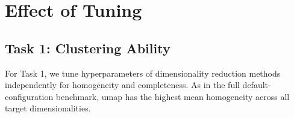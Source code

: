 


\FloatBarrier
\section{Effect of Tuning}
\label{app:ch05:tuned-results}

\FloatBarrier
\subsection{Task 1: Clustering Ability}



\FloatBarrier
For Task 1, we tune hyperparameters of dimensionality reduction methods independently for homogeneity and completeness. As in the full default-configuration benchmark, \gls{umap} has the highest mean homogeneity across all target dimensionalities.

